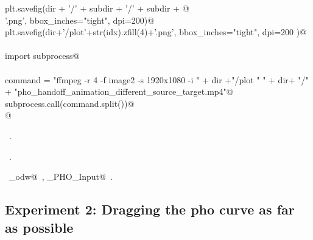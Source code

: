 \documentclass[10.0pt]{report}
\begin{document}
\begin{flushleft}
\begin{minipage}{\linewidth}
\begin{list}{}{}
\mbox{}\verb@         plt.savefig(dir + '/' + subdir + '/' + subdir + @\\
\mbox{}\verb@                     '.png', bbox_inches="tight", dpi=200)@\\
\mbox{}\verb@         plt.savefig(dir+'/plot'+str(idx).zfill(4)+'.png', bbox_inches="tight", dpi=200 )@\\
\mbox{}\verb@@\\
\mbox{}\verb@    import subprocess@\\
\mbox{}\verb@@\\
\mbox{}\verb@    command =  "ffmpeg -r 4 -f image2 -s 1920x1080 -i " + dir +"/plot%04d.png -vcodec libx264 -crf 25  -pix_fmt yuv420p " +\@\\
\mbox{}\verb@               " " + dir+ "/" + "pho_handoff_animation_different_source_target.mp4"@\\
\mbox{}\verb@    subprocess.call(command.split())@\\
\mbox{}\verb@          @\\
\mbox{}\verb@@{\NWsep}
\end{list}
\vspace{-1.5ex}
\footnotesize
\begin{list}{}{\setlength{\itemsep}{-\parsep}\setlength{\itemindent}{-\leftmargin}}
\item \NWtxtMacroDefBy\ .
\item \NWtxtMacroRefIn\ .
\item \NWtxtIdentsUsed\nobreak\  \verb@algo_odw@\nobreak\ , \verb@Single_PHO_Input@\nobreak\ .
\item{}
\end{list}
\end{minipage}\vspace{4ex}
\end{flushleft}




\subsection{Experiment 2: Dragging the pho curve as far as possible}
\end{document}

